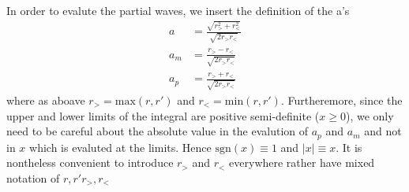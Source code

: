 \documentclass[paper=a4, fontsize=11pt]{article} %
\numberwithin{equation}{section} %
\numberwithin{figure}{section} %
\numberwithin{table}{section} %
\newcommand{\sgn}{\mathrm{sgn}}
\newcommand{\rgt}{r_{>}}
\newcommand{\rlt}{r_{<}}
\begin{document}
In order to evalute the partial waves, we insert the definition of the a's
\begin{equation}
\begin{split}
a   &=  \frac{\sqrt{\rgt^2+\rlt^2}}{\sqrt{2\rgt\rlt}} \\
a_m &=  \frac{\rgt - \rlt}{\sqrt{2\rgt\rlt}} \\
a_p &=  \frac{\rgt + \rlt}{\sqrt{2\rgt\rlt}} 
\end{split}
\end{equation}
where as aboave $\rgt = \mathrm{max}(r,r')$ and $\rlt = \mathrm{min}(r,r')$. 
Furtheremore, since the upper and lower limits of the integral are positive semi-definite ($x \geq 0$),
we only need to be careful
about the absolute value in the evalution of $a_p$ and $a_m$ and not in $x$ which is evaluted at the limits.
Hence $\sgn(x)\equiv 1$ and $|x|\equiv x$.  It is nontheless
convenient to introduce $\rgt$ and $\rlt$ everywhere rather have mixed notation of $r,r'\rgt,\rlt$
\end{document}
